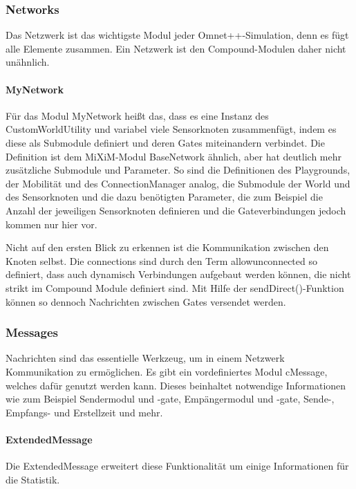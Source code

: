 \subsubsection{Networks}

Das Netzwerk ist das wichtigste Modul jeder Omnet++-Simulation, denn es fügt alle Elemente zusammen. Ein Netzwerk ist den Compound-Modulen daher nicht unähnlich. 

\paragraph{MyNetwork}

Für das Modul MyNetwork heißt das, dass es eine Instanz des CustomWorldUtility und variabel viele Sensorknoten zusammenfügt, indem es diese als Submodule definiert und deren Gates miteinandern verbindet. Die Definition ist dem MiXiM-Modul BaseNetwork ähnlich, aber hat deutlich mehr zusätzliche Submodule und Parameter. \newline
So sind die Definitionen des Playgrounds, der Mobilität und des ConnectionManager analog, die Submodule der World und des Sensorknoten und die dazu benötigten Parameter, die zum Beispiel die Anzahl der jeweiligen Sensorknoten definieren und die Gateverbindungen jedoch kommen nur hier vor.


Nicht auf den ersten Blick zu erkennen ist die Kommunikation zwischen den Knoten selbst. Die connections sind durch den Term allowunconnected so definiert, dass auch dynamisch Verbindungen aufgebaut werden können, die nicht strikt im Compound Module  definiert sind. Mit Hilfe der sendDirect()-Funktion können so dennoch Nachrichten zwischen Gates versendet werden.

\subsubsection{Messages}

Nachrichten sind das essentielle Werkzeug, um in einem Netzwerk Kommunikation zu ermöglichen. Es gibt ein vordefiniertes Modul cMessage, welches dafür genutzt werden kann. Dieses beinhaltet notwendige Informationen wie zum Beispiel Sendermodul und -gate, Empängermodul und -gate, Sende-, Empfangs- und Erstellzeit und mehr.

\paragraph{ExtendedMessage}

Die ExtendedMessage erweitert diese Funktionalität um einige Informationen für die Statistik.

